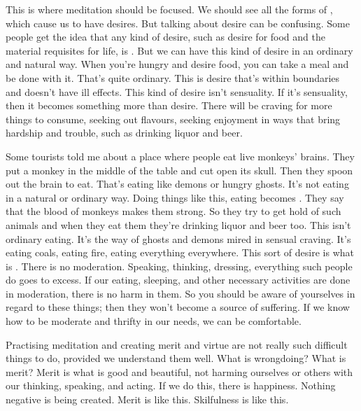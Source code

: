 This is where meditation should be focused. We should see all the forms of , which cause us to have desires. But talking about desire can be confusing. Some people get the idea that any kind of desire, such as desire for food and the material requisites for life, is . But we can have this kind of desire in an ordinary and natural way. When you're hungry and desire food, you can take a meal and be done with it. That's quite ordinary. This is desire that's within boundaries and doesn't have ill effects. This kind of desire isn't sensuality. If it's sensuality, then it becomes something more than desire. There will be craving for more things to consume, seeking out flavours, seeking enjoyment in ways that bring hardship and trouble, such as drinking liquor and beer.

Some tourists told me about a place where people eat live monkeys' brains. They put a monkey in the middle of the table and cut open its skull. Then they spoon out the brain to eat. That's eating like demons or hungry ghosts. It's not eating in a natural or ordinary way. Doing things like this, eating becomes . They say that the blood of monkeys makes them strong. So they try to get hold of such animals and when they eat them they're drinking liquor and beer too. This isn't ordinary eating. It's the way of ghosts and demons mired in sensual craving. It's eating coals, eating fire, eating everything everywhere. This sort of desire is what is . There is no moderation. Speaking, thinking, dressing, everything such people do goes to excess. If our eating, sleeping, and other necessary activities are done in moderation, there is no harm in them. So you should be aware of yourselves in regard to these things; then they won't become a source of suffering. If we know how to be moderate and thrifty in our needs, we can be comfortable.

Practising meditation and creating merit and virtue are not really such difficult things to do, provided we understand them well. What is wrongdoing? What is merit? Merit is what is good and beautiful, not harming ourselves or others with our thinking, speaking, and acting. If we do this, there is happiness. Nothing negative is being created. Merit is like this. Skilfulness is like this.


